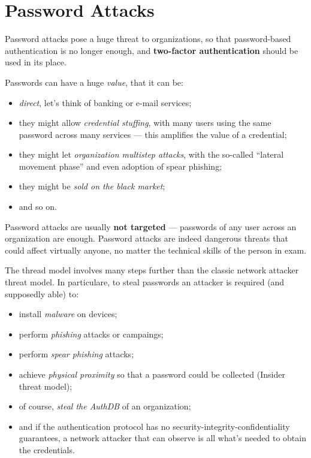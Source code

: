 \documentclass[10pt]{extreport}
\begin{document}
\section{Password Attacks}

Password attacks pose a huge threat to organizations, so that password\--based
authentication is no longer enough, and \textbf{two\--factor authentication}
should be used in its place.

Passwords can have a huge \emph{value}, that it can be:
\begin{itemize}
    \item \emph{direct}, let's think of banking or e\--mail services;
    \item they might allow \emph{credential stuffing}, with many users using
        the same password across many services --- this amplifies the value of a
        credential;
    \item they might let \emph{organization multistep attacks}, with the
        so\--called ``lateral movement phase'' and even adoption of spear phishing;
    \item they might be \emph{sold on the black market};
    \item and so on.
\end{itemize}

Password attacks are usually \textbf{not targeted} --- passwords of any
user across an organization are enough. Password attacks are indeed dangerous
threats that could affect virtually anyone, no matter the technical skills
of the person in exam.

The thread model involves many steps further than the classic network attacker
threat model. In particulare, to steal passwords an attacker is required (and
supposedly able) to:
\begin{itemize}
    \item install \emph{malware} on devices;
    \item perform \emph{phishing} attacks or campaings;
    \item perform \emph{spear phishing} attacks;
    \item achieve \emph{physical proximity} so that a password could be
        collected (Insider threat model);
    \item of course, \emph{steal the AuthDB} of an organization;
    \item and if the authentication protocol has no
        security\--integrity\--confidentiality guarantees, a network attacker
        that can observe is all what's needed to obtain the credentials.
\end{itemize}
\end{document}
